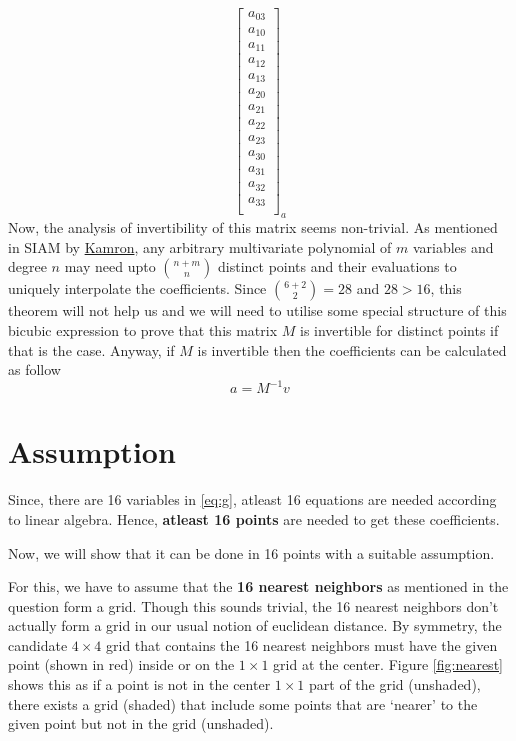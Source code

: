 \documentclass[a4paper, landscape]{article}
\begin{document}
\begin{equation}
{\begin{bmatrix}
    a_{03}\\
    a_{10}\\
    a_{11}\\
    a_{12}\\
    a_{13}\\
    a_{20}\\
    a_{21}\\
    a_{22}\\
    a_{23}\\
    a_{30}\\
    a_{31}\\
    a_{32}\\
    a_{33}\\
    \end{bmatrix}
    }_{a}\label{eq:g}
\end{equation}
Now, the analysis of invertibility of this matrix seems non-trivial. As mentioned in SIAM by \href{https://evoq-n.org/Portals/0/Publications/SIURO/Vol1_Issue1/A_Simple_Expression_for_Multivariate.pdf}{Kamron}, any arbitrary multivariate polynomial of $m$ variables and degree $n$ may need upto $\binom{n+m}{n}$ distinct points and their evaluations to uniquely interpolate the coefficients. Since $\binom{6+2}{2}=28$ and $28>16$, this theorem will not help us and we will need to utilise some special structure of this bicubic expression to prove that this matrix $M$ is invertible for distinct points if that is the case. Anyway, if $M$ is invertible then the coefficients can be calculated as follow
\begin{equation}
    a = M^{-1} v
\end{equation}
\section{Assumption}
Since, there are 16 variables in \ref{eq:g}, {atleast 16 equations} are needed according to linear algebra. Hence, \textbf{atleast 16 points} are needed to get these coefficients.

Now, we will show that it can be done in 16 points with a suitable assumption.

For this, we have to assume that the \textbf{16 nearest neighbors} as mentioned in the question form a grid. Though this sounds trivial, the 16 nearest neighbors don't actually form a grid in our usual notion of euclidean distance. By symmetry, the candidate $4\times4$ grid that contains the 16 nearest neighbors must have the given point (shown in red) inside or on the $1\times1$ grid at the center. Figure \ref{fig:nearest} shows this as if a point is not in the center $1\times1$ part of the grid (unshaded), there exists a grid (shaded) that include some points that are `nearer' to the given point but not in the grid (unshaded). 
\end{document}
